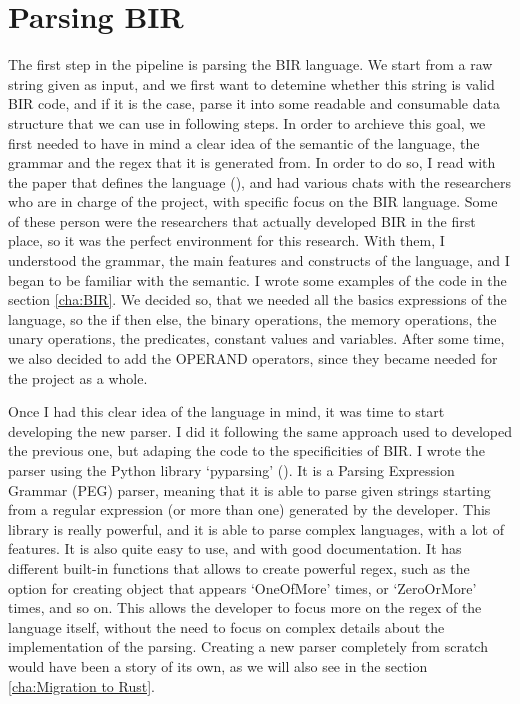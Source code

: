 \section{Parsing BIR}
\label{cha:Parsing BIR} The first step in the pipeline is parsing the BIR
language. We start from a raw string given as input, and we first want to
detemine whether this string is valid BIR code, and if it is the case, parse it
into some readable and consumable data structure that we can use in following
steps. In order to archieve this goal, we first needed to have in mind a clear
idea of the semantic of the language, the grammar and the regex that it is generated
from. In order to do so, I read with the paper that defines the language (\cite{bir_pub}),
and had various chats with the researchers who are in charge of the project, with
specific focus on the BIR language. Some of these person were the researchers
that actually developed BIR in the first place, so it was the perfect environment
for this research. With them, I understood the grammar, the main features and
constructs of the language, and I began to be familiar with the semantic. I
wrote some examples of the code in the section \ref{cha:BIR}. We decided so,
that we needed all the basics expressions of the language, so the if then else,
the binary operations, the memory operations, the unary operations, the predicates,
constant values and variables. After some time, we also decided to add the
OPERAND operators, since they became needed for the project as a whole.

Once I had this clear idea of the language in mind, it was time to start
developing the new parser. I did it following the same approach used to developed
the previous one, but adaping the code to the specificities of BIR. I wrote the parser
using the Python library `pyparsing' (\cite{pyparsing}). It is a Parsing
Expression Grammar (PEG) parser, meaning that it is able to parse given strings starting
from a regular expression (or more than one) generated by the developer. This
library is really powerful, and it is able to parse complex languages, with a
lot of features. It is also quite easy to use, and with good documentation. It has
different built-in functions that allows to create powerful regex, such as the
option for creating object that appears `OneOfMore' times, or `ZeroOrMore' times,
and so on. This allows the developer to focus more on the regex of the language itself,
without the need to focus on complex details about the implementation of the
parsing. Creating a new parser completely from scratch would have been a story of
its own, as we will also see in the section \ref{cha:Migration to Rust}.

